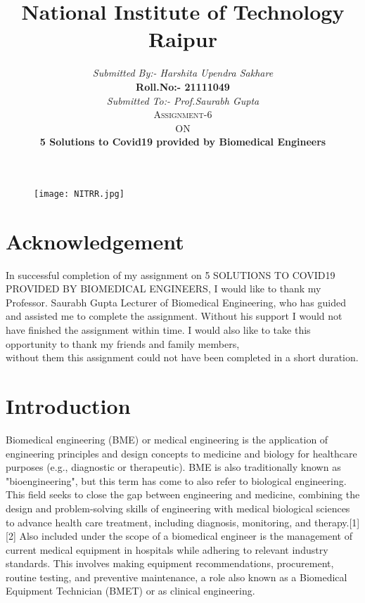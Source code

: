 \documentclass[12pt]{article}
\begin{document}
\title{\huge National Institute of Technology Raipur}
\begin{figure}
\centering
\texttt{[image: NITRR.jpg]}
\end{figure}
\author{\textit{Submitted By:- Harshita Upendra Sakhare}\\ \textbf{Roll.No:- 21111049}\\ \textit{Submitted To:- Prof.Saurabh Gupta}\\ \textsc{Assignment-6}\\ \textsc{ON}\\ \textbf{5 Solutions to Covid19 provided by Biomedical Engineers}}

\maketitle
\clearpage
\tableofcontents
\clearpage

\section{Acknowledgement}
\hspace{1cm}
In successful completion of my assignment on 5 SOLUTIONS TO COVID19 PROVIDED BY BIOMEDICAL ENGINEERS, I would like to thank my
Professor. Saurabh Gupta Lecturer of Biomedical Engineering, who
has guided and assisted me to complete the assignment. Without
his support I would not have finished the assignment within time.
I would also like to take this opportunity to thank my friends
and family members,\\without them this assignment could not have
been completed in a short duration.
\clearpage
\section{Introduction}
\hspace{1cm}
Biomedical engineering (BME) or medical engineering is the application of engineering principles and design concepts to medicine and biology for healthcare purposes (e.g., diagnostic or therapeutic). BME is also traditionally known as "bioengineering", but this term has come to also refer to biological engineering. This field seeks to close the gap between engineering and medicine, combining the design and problem-solving skills of engineering with medical biological sciences to advance health care treatment, including diagnosis, monitoring, and therapy.[1][2] Also included under the scope of a biomedical engineer is the management of current medical equipment in hospitals while adhering to relevant industry standards. This involves making equipment recommendations, procurement, routine testing, and preventive maintenance, a role also known as a Biomedical Equipment Technician (BMET) or as clinical engineering.
\end{document}
